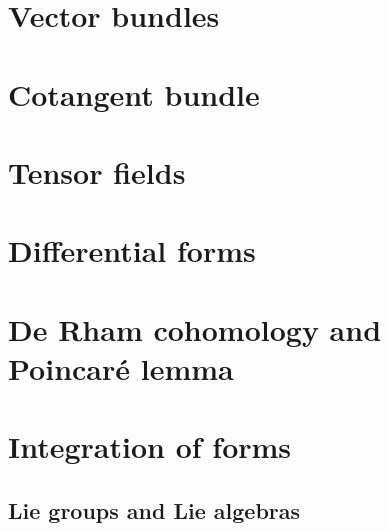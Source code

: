 \documentclass[nobib, a4paper]{tufte-book}
\theoremstyle{plain}
\theoremstyle{definition}
\theoremstyle{remark}
\newcommand{\Q}{\mathbb{Q}}
\newcommand{\R}{\mathbb{R}}
\begin{document}
\chapter{Vector bundles}\label{sec:vectorbundle}


\chapter{Cotangent bundle}\label{cg:ctb}


\chapter{Tensor fields}\label{cg:tf}


\chapter{Differential forms}


\chapter{De Rham cohomology and Poincar\'e lemma}


\chapter{Integration of forms}


\begin{appendices}
  \chapter{Lie groups and Lie algebras}\label{appendix:Lie}
  

  
\end{appendices}




\printbibliography
{}
\end{document}
